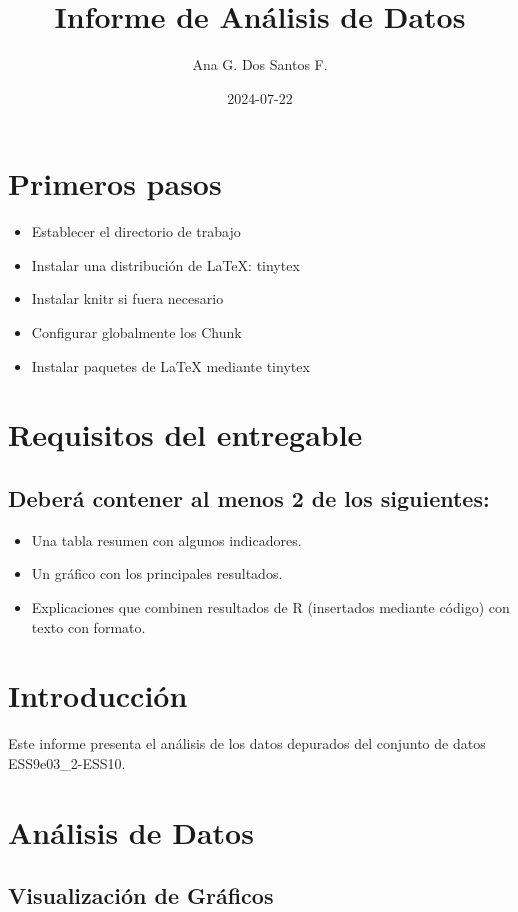 \documentclass{article}\usepackage[]{graphicx}\usepackage[]{xcolor}
\title{Informe de Análisis de Datos}
\author{Ana G. Dos Santos F.}
\date{2024-07-22}
\begin{document}
\maketitle

\section*{Primeros pasos}

\begin{itemize}
\item Establecer el directorio de trabajo
\item Instalar una distribución de \LaTeX{}: tinytex
\item Instalar knitr si fuera necesario
\item Configurar globalmente los Chunk
\item Instalar paquetes de \LaTeX{} mediante tinytex
\end{itemize}





\section{Requisitos del entregable}
\subsection{Deberá contener al menos 2 de los siguientes:}

\begin{itemize}
\item Una tabla resumen con algunos indicadores.
\item Un gráfico con los principales resultados.
\item Explicaciones que combinen resultados de R (insertados mediante código) con texto con formato.
\end{itemize}

\section{Introducción}
Este informe presenta el análisis de los datos depurados del conjunto de datos ESS9e03\_2-ESS10.

\section{Análisis de Datos}

\subsection{Visualización de Gráficos}
\end{document}
